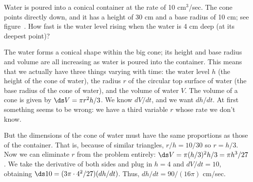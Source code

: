 \begin{example} Water is poured into a conical container at the rate of 10
cm${}^3$/sec.  The cone points directly down, and it has a height of
30 cm and a base radius of 10 cm; see figure~.
How fast is the water level rising when the water is 4 cm deep (at its
deepest point)?

The water forms a conical shape within the big cone; its
height and base radius and volume are all increasing
as water is poured into the container.  This means that we actually have
three things varying with time: the water level $h$ (the height of the cone
of water), the radius $r$ of the circular top surface of water (the base
radius of the cone of water), and the volume of water $V$.  
The volume of a cone is given by
$\ds V=\pi r^2h/3$.  We know $dV/dt$, and we want $dh/dt$.  At
first something seems to be wrong: we have a third variable $r$ whose rate
we don't know.  


But the dimensions of the cone of water must have the same
proportions as those of the container.  
That is, because of similar triangles, 
$r/h=10/30$ so $r=h/3$.  Now we can eliminate $r$ from the
problem entirely: $\ds V=\pi(h/3)^2h/3=\pi h^3/27$.  We take
the derivative of both sides and plug in $h=4$ and $dV/dt=10$, obtaining
$\ds 10=(3\pi\cdot 4^2/27)(dh/dt)$.  Thus, $dh/dt=90/(16\pi)$
cm/sec.
\end{example}

